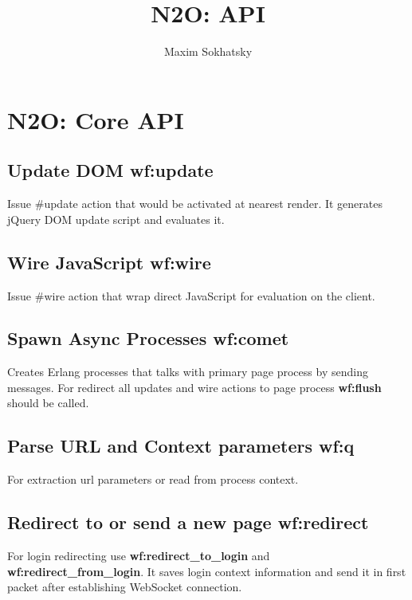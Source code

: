 \documentclass[11pt]{article}
\begin{document}
\title{N2O: API}
\author{Maxim Sokhatsky}

\paragraph{}
\section*{N2O: Core API}

\subsection*{Update DOM \bf{wf:update}}
Issue #update{} action that would be activated at nearest render.
It generates jQuery DOM update script and evaluates it.

\subsection*{Wire JavaScript \bf{wf:wire}}
Issue #wire{} action that wrap direct JavaScript for evaluation on the client.

\subsection*{Spawn Async Processes \bf{wf:comet}}
Creates Erlang processes that talks with primary page process by sending messages.
For redirect all updates and wire actions to page process {\bf wf:flush} should be called.

\subsection*{Parse URL and Context parameters \bf{wf:q}}
For extraction url parameters or read from process context.

\subsection*{Redirect to or send a new page \bf{wf:redirect}}
For login redirecting use {\bf{wf:redirect_to_login}} and {\bf{wf:redirect_from_login}}.
It saves login context information and send it in first packet after establishing WebSocket connection.
\end{document}
